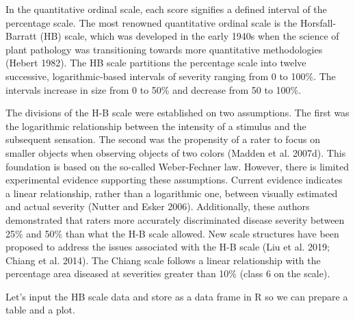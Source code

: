 \documentclass[
  letterpaper,
]{book}
\begin{document}
In the quantitative ordinal scale, each score signifies a defined
interval of the percentage scale. The most renowned quantitative ordinal
scale is the Horsfall-Barratt (HB) scale, which was developed in the
early 1940s when the science of plant pathology was transitioning
towards more quantitative methodologies (Hebert 1982). The HB scale
partitions the percentage scale into twelve successive,
logarithmic-based intervals of severity ranging from 0 to 100\%. The
intervals increase in size from 0 to 50\% and decrease from 50 to 100\%.

\begin{tcolorbox}[enhanced jigsaw, titlerule=0mm, rightrule=.15mm, colbacktitle=quarto-callout-warning-color!10!white, opacitybacktitle=0.6, toptitle=1mm, leftrule=.75mm, colback=white, colframe=quarto-callout-warning-color-frame, bottomrule=.15mm, toprule=.15mm, breakable, bottomtitle=1mm, coltitle=black, title=\textcolor{quarto-callout-warning-color}{\faExclamationTriangle}\hspace{0.5em}{Controversy of the H-B scale}, arc=.35mm, opacityback=0, left=2mm]

The divisions of the H-B scale were established on two assumptions. The
first was the logarithmic relationship between the intensity of a
stimulus and the subsequent sensation. The second was the propensity of
a rater to focus on smaller objects when observing objects of two colors
(Madden et al. 2007d). This foundation is based on the so-called
Weber-Fechner law. However, there is limited experimental evidence
supporting these assumptions. Current evidence indicates a linear
relationship, rather than a logarithmic one, between visually estimated
and actual severity (Nutter and Esker 2006). Additionally, these authors
demonstrated that raters more accurately discriminated disease severity
between 25\% and 50\% than what the H-B scale allowed. New scale
structures have been proposed to address the issues associated with the
H-B scale (Liu et al. 2019; Chiang et al. 2014). The Chiang scale
follows a linear relationship with the percentage area diseased at
severities greater than 10\% (class 6 on the scale).

\end{tcolorbox}

Let's input the HB scale data and store as a data frame in R so we can
prepare a table and a plot.
\end{document}
